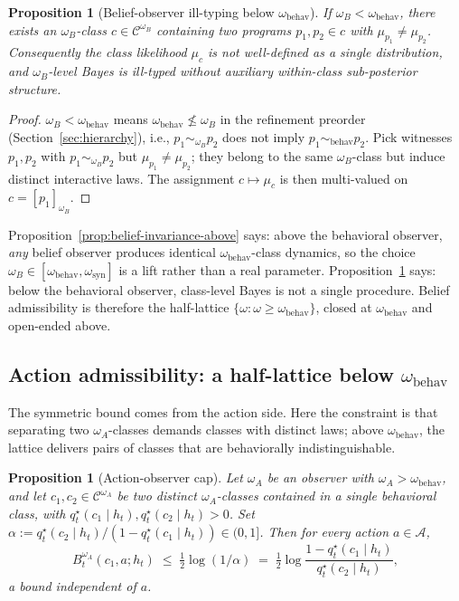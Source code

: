 \documentclass[11pt]{article}
\newtheorem{proposition}[theorem]{Proposition}
\theoremstyle{definition}
\theoremstyle{remark}
\newcommand{\Acal}{\mathcal{A}}
\newcommand{\Ccal}{\mathcal{C}}
\begin{document}
\begin{proposition}[Belief-observer ill-typing below $\omega_{\mathrm{behav}}$]
\label{prop:belief-illtyped-below}
If $\omega_B<\omega_{\mathrm{behav}}$, there exists an $\omega_B$-class $c\in\Ccal^{\omega_B}$ containing two programs $p_1,p_2\in c$ with $\mu_{p_1}\neq\mu_{p_2}$. Consequently the class likelihood $\mu_c$ is not well-defined as a single distribution, and $\omega_B$-level Bayes is ill-typed without auxiliary within-class sub-posterior structure.
\end{proposition}

\begin{proof}
$\omega_B<\omega_{\mathrm{behav}}$ means $\omega_{\mathrm{behav}}\not\le\omega_B$ in the refinement preorder (Section~\ref{sec:hierarchy}), i.e., $p_1\sim_{\omega_B}p_2$ does not imply $p_1\sim_{\mathrm{behav}}p_2$. Pick witnesses $p_1,p_2$ with $p_1\sim_{\omega_B}p_2$ but $\mu_{p_1}\neq\mu_{p_2}$; they belong to the same $\omega_B$-class but induce distinct interactive laws. The assignment $c\mapsto\mu_c$ is then multi-valued on $c=[p_1]_{\omega_B}$.
\end{proof}

Proposition~\ref{prop:belief-invariance-above} says: above the behavioral observer, \emph{any} belief observer produces identical $\omega_{\mathrm{behav}}$-class dynamics, so the choice $\omega_B\in[\omega_{\mathrm{behav}},\omega_{\mathrm{syn}}]$ is a lift rather than a real parameter. Proposition~\ref{prop:belief-illtyped-below} says: below the behavioral observer, class-level Bayes is not a single procedure. Belief admissibility is therefore the half-lattice $\{\omega:\omega\ge\omega_{\mathrm{behav}}\}$, closed at $\omega_{\mathrm{behav}}$ and open-ended above.

\subsection{Action admissibility: a half-lattice below $\omega_{\mathrm{behav}}$}
\label{sec:action-admissibility}

The symmetric bound comes from the action side. Here the constraint is that separating two $\omega_A$-classes demands classes with distinct laws; above $\omega_{\mathrm{behav}}$, the lattice delivers pairs of classes that are behaviorally indistinguishable.

\begin{proposition}[Action-observer cap]
\label{prop:action-cap}
Let $\omega_A$ be an observer with $\omega_A>\omega_{\mathrm{behav}}$, and let $c_1,c_2\in\Ccal^{\omega_A}$ be two distinct $\omega_A$-classes contained in a single behavioral class, with $q_t^\star(c_1\mid h_t),q_t^\star(c_2\mid h_t)>0$. Set $\alpha:=q_t^\star(c_2\mid h_t)/(1-q_t^\star(c_1\mid h_t))\in(0,1]$. Then for every action $a\in\Acal$,
\[
B_t^{\omega_A}(c_1,a;h_t)\;\le\;\tfrac{1}{2}\log(1/\alpha)
\;=\;\tfrac{1}{2}\log\!\frac{1-q_t^\star(c_1\mid h_t)}{q_t^\star(c_2\mid h_t)},
\]
a bound independent of $a$.
\end{proposition}
\end{document}
